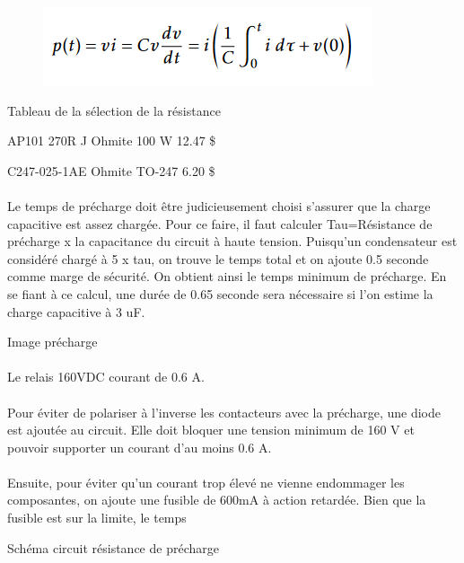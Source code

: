 		\begin{figure}[H]
			\centering
			\includegraphics[width=0.4\linewidth]{../Images/CalculPuissancePrecharge}
		\end{figure}
		
		
		Tableau de la sélection de la résistance
		
		AP101 270R J 
		Ohmite
		100 W
		12.47 \$
		
		C247-025-1AE
		Ohmite
		TO-247
		6.20 \$

		\paragraph*{}		
		Le temps de précharge doit être judicieusement choisi s'assurer que la charge capacitive est assez chargée. Pour ce faire, il faut calculer Tau=Résistance de précharge x la capacitance du circuit à haute tension. Puisqu'un condensateur est considéré chargé à 5 x tau, on trouve le temps total et on ajoute 0.5 seconde comme marge de sécurité. On obtient ainsi le temps minimum de précharge. En se fiant à ce calcul, une durée de 0.65 seconde sera nécessaire si l'on estime la charge capacitive à 3 uF.

		Image précharge
		
		\paragraph*{}		
		Le relais 160VDC courant de 0.6 A.
	
		\paragraph*{}	
		Pour éviter de polariser à l'inverse les contacteurs avec la précharge, une diode est ajoutée au circuit. Elle doit bloquer une tension minimum de 160 V et pouvoir supporter un courant d'au moins 0.6 A. 
		
		\paragraph*{}			
		Ensuite, pour éviter qu'un courant trop élevé ne vienne endommager les composantes, on ajoute une fusible de 600mA à action retardée. Bien que la fusible est sur la limite, le temps 
		
		Schéma circuit résistance de précharge
			
		
